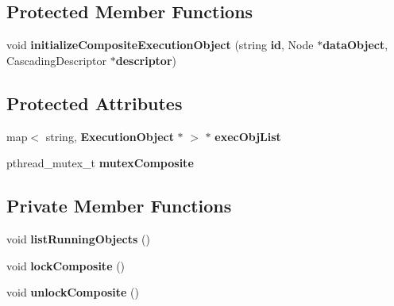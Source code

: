 \subsection*{Protected Member Functions}
\begin{CompactItemize}
\item 
void \textbf{initializeCompositeExecutionObject} (string {\bf id}, Node $\ast${\bf dataObject}, CascadingDescriptor $\ast${\bf descriptor})\label{classbr_1_1pucrio_1_1telemidia_1_1ginga_1_1ncl_1_1model_1_1components_1_1CompositeExecutionObject_d493b13da9801a0f0a2642c6bc37b384}

\end{CompactItemize}
\subsection*{Protected Attributes}
\begin{CompactItemize}
\item 
map$<$ string, {\bf ExecutionObject} $\ast$ $>$ $\ast$ {\bf execObjList}\label{classbr_1_1pucrio_1_1telemidia_1_1ginga_1_1ncl_1_1model_1_1components_1_1CompositeExecutionObject_e008dff04ef1e0b913526eab9b4be95d}

\item 
pthread\_\-mutex\_\-t {\bf mutexComposite}\label{classbr_1_1pucrio_1_1telemidia_1_1ginga_1_1ncl_1_1model_1_1components_1_1CompositeExecutionObject_88e07893e891d6df24765f25ef1dccd1}

\end{CompactItemize}
\subsection*{Private Member Functions}
\begin{CompactItemize}
\item 
void \textbf{listRunningObjects} ()\label{classbr_1_1pucrio_1_1telemidia_1_1ginga_1_1ncl_1_1model_1_1components_1_1CompositeExecutionObject_9aad29725005fd658d7c88f59f92a8c6}

\item 
void \textbf{lockComposite} ()\label{classbr_1_1pucrio_1_1telemidia_1_1ginga_1_1ncl_1_1model_1_1components_1_1CompositeExecutionObject_08e2e145efdd29a18ccca0f769bad539}

\item 
void \textbf{unlockComposite} ()\label{classbr_1_1pucrio_1_1telemidia_1_1ginga_1_1ncl_1_1model_1_1components_1_1CompositeExecutionObject_6b5ece810d00e30f0ca32f146a0c8003}

\end{CompactItemize}
